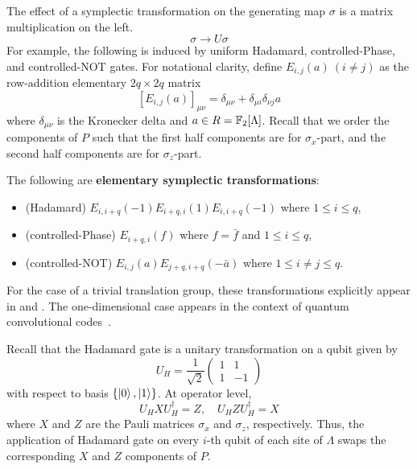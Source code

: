 The effect of a symplectic transformation on the generating map $\sigma$
 is a matrix multiplication on the left.
\[
 \sigma \to U \sigma
\]
For example, the following is induced
by uniform Hadamard, controlled-Phase, and controlled-NOT gates.
For notational clarity,
define $E_{i,j}(a)\ (i \neq j)$ as the row-addition elementary $2q \times 2q$ matrix
\[
 \left[ E_{i,j}(a) \right]_{\mu \nu} = \delta_{\mu \nu} + \delta_{\mu i} \delta_{\nu j} a
\]
where $\delta_{\mu \nu}$ is the Kronecker delta and $a \in R = \mathbb{F}_2[\Lambda]$.
Recall that we order the components of $P$ such that the first half components are for $\sigma_x$-part, 
and the second half components are for $\sigma_z$-part.
\begin{defn}
The following are {\bf elementary symplectic transformations}:
\begin{itemize}
 \item (Hadamard) $E_{i,i+q}(-1) E_{i+q,i}(1) E_{i,i+q}(-1)$ where $1 \le i \le q$,
 \item (controlled-Phase) $E_{i+q,i}(f)$ where $f = \bar f$ and $1 \le i \le q$,
 \item (controlled-NOT) $E_{i,j}(a) E_{j+q,i+q}(-\bar a)$ where $1 \le i \ne j \le q$.
\end{itemize}
\end{defn}
For the case of a trivial translation group,
these transformations explicitly appear in \cite{CalderbankRainsShorEtAl1997Quantum}
and \cite[Chapter~15]{KitaevShenVyalyi2002CQC}.
The one-dimensional case appears in the context of
quantum convolutional codes~\cite{GrasslRotteler2006Convolutional}.

Recall that the Hadamard gate is a unitary transformation on a qubit given by
\[
U_H = \frac{1}{\sqrt 2}
 \begin{pmatrix}
  1 & 1 \\
  1 & -1
 \end{pmatrix}
\]
with respect to basis $\{ \left| {0} \right\rangle , \left| {1} \right\rangle \}$.
At operator level,
\[
 U_H X U_H^\dagger = Z, \quad U_H Z U_H^\dagger = X 
\]
where $X$ and $Z$ are the Pauli matrices $\sigma_x$ and $\sigma_z$, respectively.
Thus, the application of Hadamard gate on every $i$-th qubit of each site of $\Lambda$
swaps the corresponding $X$ and $Z$ components of $P$.



